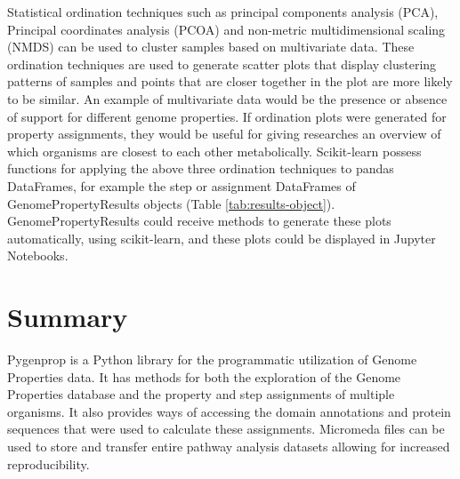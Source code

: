 Statistical ordination techniques such as principal components analysis (PCA), Principal coordinates analysis (PCOA) and non-metric multidimensional scaling (NMDS) can be used to cluster samples based on multivariate data. These ordination techniques are used to generate scatter plots that display clustering patterns of samples and points that are closer together in the plot are more likely to be similar. An example of multivariate data would be the presence or absence of support for different genome properties. If ordination plots were generated for property assignments, they would be useful for giving researches an overview of which organisms are closest to each other metabolically. Scikit-learn \cite{pedregosa2011scikit} possess functions for applying the above three ordination techniques to pandas DataFrames, for example the step or assignment DataFrames of GenomePropertyResults objects (Table \ref{tab:results-object}). GenomePropertyResults could receive methods to generate these plots automatically, using scikit-learn, and these plots could be displayed in Jupyter Notebooks.

\section{Summary}

Pygenprop is a Python library for the programmatic utilization of Genome Properties data. It has methods for both the exploration of the Genome Properties database and the property and step assignments of multiple organisms. It also provides ways of accessing the domain annotations and protein sequences that were used to calculate these assignments. Micromeda files can be used to store and transfer entire pathway analysis datasets allowing for increased reproducibility.

